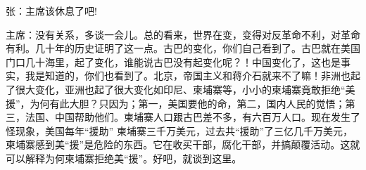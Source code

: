 张：主席该休息了吧!

主席：没有关系，多谈一会儿。总的看来，世界在变，变得对反革命不利，对革命有利。几十年的历史证明了这一点。古巴的变化，你们自己看到了。古巴就在美国门口几十海里，起了变化，谁能说古巴没有起变化呢？！中国变化了，这也是事实，我是知道的，你们也看到了。北京，帝国主义和蒋介石就来不了嘛！非洲也起了很大变化，亚洲也起了很大变化如印尼、柬埔寨等，小小的柬埔寨竟敢拒绝“美援”，为何有此大胆？只因为；第一，美国要他的命，第二，国内人民的觉悟；第三，法国、中国帮助他们。柬埔寨人口跟古巴差不多，有六百万人口。现在发生了怪现象，美国每年“援助” 柬埔寨三千万美元，过去共“援助”了三亿几千万美元，柬埔寨感到美“援”是危险的东西。它在收买干部，腐化干部，并搞颠覆活动。这就可以解释为何柬埔寨拒绝美“援”。好吧，就谈到这里。

